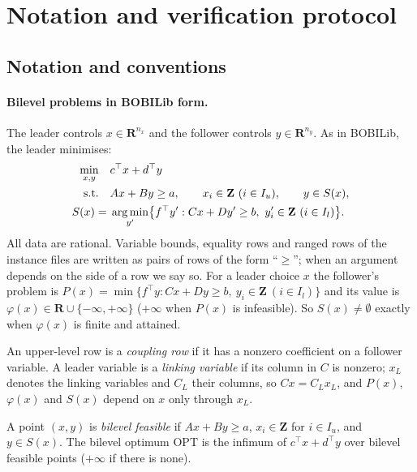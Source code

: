 \section{Notation and verification protocol}\label{app:notation}

\subsection{Notation and conventions}\label{app:conventions}

\paragraph{Bilevel problems in BOBILib form.}
The leader controls $x\in\mathbf{R}^{n_x}$ and the follower controls
$y\in\mathbf{R}^{n_y}$. As in BOBILib,\cite{thurauf2026bobilib} the leader minimises:
\begin{align}
  \min_{x,y}\quad & c^{\top}x+d^{\top}y \label{eq:bl}\\
  \text{s.t.}\quad & Ax+By\ge a,\qquad x_i\in\mathbf{Z}\ (i\in I_u),\qquad y\in S(x),\notag\\
  S(x)={}&\operatorname*{arg\,min}_{y'}\bigl\{f^{\top}y' : Cx+Dy'\ge b,\ y'_i\in\mathbf{Z}\ (i\in I_l)\bigr\}. \notag
\end{align}
All data are rational. Variable bounds, equality rows and ranged rows of
the instance files are written as pairs of rows of the form ``$\ge$''; when
an argument depends on the side of a row we say so. For a leader choice $x$
the follower's problem is
$P(x)=\min\{f^{\top}y : Cx+Dy\ge b,\ y_i\in\mathbf{Z}\ (i\in I_l)\}$ and its value
is $\varphi(x)\in\mathbf{R}\cup\{-\infty,+\infty\}$ ($+\infty$ when $P(x)$ is
infeasible). So $S(x)\neq\emptyset$ exactly when $\varphi(x)$ is finite and
attained.

An upper-level row is a \emph{coupling row} if it has a nonzero coefficient
on a follower variable. A leader variable is a \emph{linking variable} if its
column in $C$ is nonzero; $x_L$ denotes the linking variables and $C_L$ their
columns, so $Cx=C_Lx_L$, and $P(x)$, $\varphi(x)$ and $S(x)$ depend on $x$ only
through $x_L$.

\begin{definition}\label{def:bilevel-feasible}
A point $(x,y)$ is \emph{bilevel feasible} if $Ax+By\ge a$, $x_i\in\mathbf{Z}$ for
$i\in I_u$, and $y\in S(x)$. The bilevel optimum $\mathrm{OPT}$ is the infimum
of $c^{\top}x+d^{\top}y$ over bilevel feasible points ($+\infty$ if there is
none).
\end{definition}

